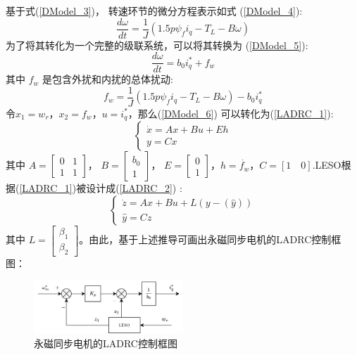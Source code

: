 ﻿\documentclass[12pt,a4paper]{article}
\begin{document}
基于式(\ref{DModel_3})， 转速环节的微分方程表示如式 (\ref{DModel_4}):
\begin{equation}
  \label{DModel_4}
  \frac{d\omega}{dt}=\frac{1}{J}(1.5p\psi_{f}i_{q}-T_L-B\omega)
\end{equation}
为了将其转化为一个完整的级联系统，可以将其转换为 (\ref{DModel_5}):
\begin{equation}
  \label{DModel_5}
  \frac{d\omega}{dt}=b_0i_q^{\ast}+f_w
\end{equation}
其中 $f_w$ 是包含外扰和内扰的总体扰动:
\begin{equation}
  \label{DModel_6}
  f_w = \frac{1}{J}(1.5p\psi_{f}i_{q}-T_L-B\omega)-b_0i_q^{\ast}
\end{equation}
令$x_1=w_r$，$x_2=f_w$，$u=i_q^{\ast}$，那么(\ref{DModel_6}) 可以转化为(\ref{LADRC_1}):
\begin{equation}
  \label{LADRC_1}
  \left\{\begin{array}{l}
    \dot{x}=Ax+Bu+Eh \\
    y=Cx
  \end{array}\right.
\end{equation}
其中 $A = \begin{bmatrix}
    0 & 1 \\
    1 & 1
  \end{bmatrix}$，
$B = \begin{bmatrix}
    b_0 \\
    1
  \end{bmatrix}$，
$E = \begin{bmatrix}
    0 \\
    1
  \end{bmatrix}$，$h=\dot{f_w}$，$C=[1\quad 0]$.LESO根据(\ref{LADRC_1})被设计成(\ref{LADRC_2}) :
\begin{equation}
  \label{LADRC_2}
  \left\{\begin{array}{l}
    \dot{z}=Ax+Bu+L(y-(\hat{y})) \\
    \hat{y}=Cz
  \end{array}\right.
\end{equation}
其中 $L=\begin{bmatrix}
    \beta_1 \\
    \beta_2
  \end{bmatrix}$。由此，基于上述推导可画出永磁同步电机的LADRC控制框图：

\begin{figure}[ht]
  \centering
  \includegraphics[width=0.5\textwidth]{./picture/LADRC控制框图.png}
  \caption{永磁同步电机的LADRC控制框图}
  \label{LADRC}
\end{figure}
\end{document}
